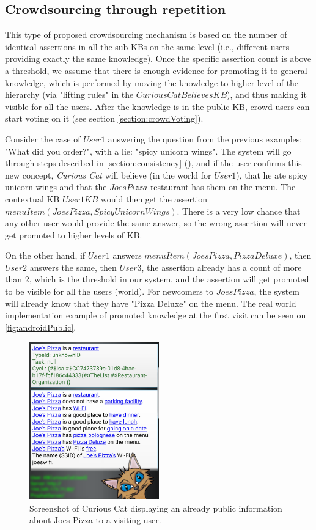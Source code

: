 \subsection{Crowdsourcing through repetition}
\label{section:crowdRepetition}
This type of proposed crowdsourcing mechanism is based on the number of 
identical assertions in all the sub-KBs on the same level (i.e., different 
users providing exactly the same knowledge). Once the specific assertion count 
is above a threshold, we assume that there is enough evidence for promoting it 
to general knowledge, which is performed by moving the knowledge to higher 
level of the hierarchy (via "lifting rules" in the $CuriousCatBelievesKB$), 
and thus making it visible for all the users. After the knowledge is in the 
public KB, crowd users can start voting on it (see section 
\ref{section:crowdVoting}).

Consider the case of $User1$ answering the question from the previous examples: 
"What did you order?", with a lie: "spicy unicorn wings". The system will go 
through steps described in \autoref{section:consistency}
(), and if the user confirms this new 
concept, \emph{Curious Cat} will believe (in the world for $User1$), that he 
ate spicy unicorn wings and that the $JoesPizza$ restaurant has them on the
menu. The contextual KB $User1KB$ would then get the assertion 
$menuItem(JoesPizza,SpicyUnicornWings)$. There is a very low chance that any 
other user would provide the same answer, so the wrong assertion will never get 
promoted to higher levels of KB.

On the other hand, if $User1$ answers $menuItem(JoesPizza,PizzaDeluxe)$, then 
$User2$ answers the same, then $User3$, the assertion already has a count of 
more than 2, which is the threshold in our system, and the assertion will get 
promoted to be visible for all the users (world). For newcomers to $JoesPizza$, 
the system will already know that they have "Pizza Deluxe" on the menu.
The real world implementation example of promoted knowledge at the first 
visit can be seen on \autoref{fig:androidPublic}.

\begin{figure}[h]
	\centering
		\includegraphics[width=0.5\textwidth]{figures/androidPublic.png}
	\caption{Screenshot of Curious Cat displaying an already public information about Joes Pizza to a visiting user.}
	\label{fig:androidPublic}
\end{figure}

